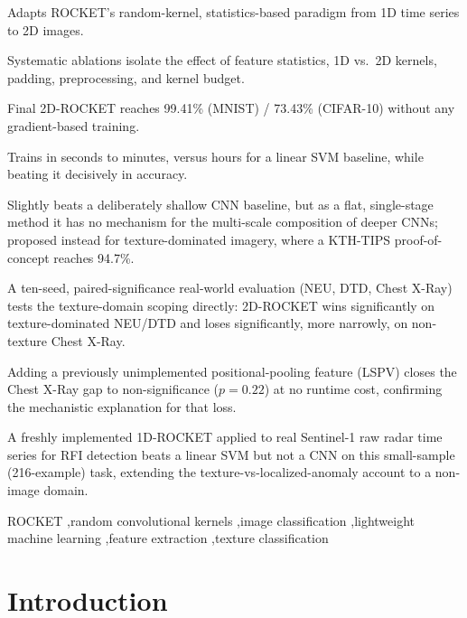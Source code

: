 \documentclass[a4paper,fleqn]{cas-sc}
\begin{document}
\begin{highlights}
\item Adapts ROCKET's random-kernel, statistics-based paradigm from 1D time series to 2D images.
\item Systematic ablations isolate the effect of feature statistics, 1D vs.\ 2D kernels, padding, preprocessing, and kernel budget.
\item Final 2D-ROCKET reaches 99.41\% (MNIST) / 73.43\% (CIFAR-10) without any gradient-based training.
\item Trains in seconds to minutes, versus hours for a linear SVM baseline, while beating it decisively in accuracy.
\item Slightly beats a deliberately shallow CNN baseline, but as a flat, single-stage method it has no mechanism for the multi-scale composition of deeper CNNs; proposed instead for texture-dominated imagery, where a KTH-TIPS proof-of-concept reaches 94.7\%.
\item A ten-seed, paired-significance real-world evaluation (NEU, DTD, Chest X-Ray) tests the texture-domain scoping directly: 2D-ROCKET wins significantly on texture-dominated NEU/DTD and loses significantly, more narrowly, on non-texture Chest X-Ray.
\item Adding a previously unimplemented positional-pooling feature (LSPV) closes the Chest X-Ray gap to non-significance ($p=0.22$) at no runtime cost, confirming the mechanistic explanation for that loss.
\item A freshly implemented 1D-ROCKET applied to real Sentinel-1 raw radar time series for RFI detection beats a linear SVM but not a CNN on this small-sample (216-example) task, extending the texture-vs-localized-anomaly account to a non-image domain.
\end{highlights}

\begin{keywords}
ROCKET \sep random convolutional kernels \sep image classification \sep lightweight machine learning \sep feature extraction \sep texture classification
\end{keywords}

\maketitle

\section{Introduction}\label{sec:intro}
\end{document}
